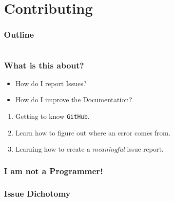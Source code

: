 \section{Contributing}

\begin{frame}
	\frametitle{Outline}
	\begin{columns}[t]
		\begin{column}{.5\textwidth}
			\tableofcontents[sections={1-9},currentsection]
		\end{column}
		\begin{column}{.5\textwidth}
			\tableofcontents[sections={10-18},currentsection]
		\end{column}
	\end{columns}
\end{frame}

\begin{frame}
	\frametitle{What is this about?}
	\begin{question}[Questions]
		\begin{itemize}
			\item How do I report Issues?
			\item How do I improve the Documentation?
		\end{itemize}
	\end{question}
	\begin{docs}[Objectives]
		\begin{enumerate}
			\item Getting to know \texttt{GitHub}.
			\item Learn how to figure out where an error comes from.
			\item Learning how to create a \emph{meaningful} issue report.
		\end{enumerate}
	\end{docs}
\end{frame}

\begin{frame}
  \frametitle{I am not a Programmer!}
  
\end{frame}

\begin{frame}
  \frametitle{Issue Dichotomy}
  
\end{frame}

